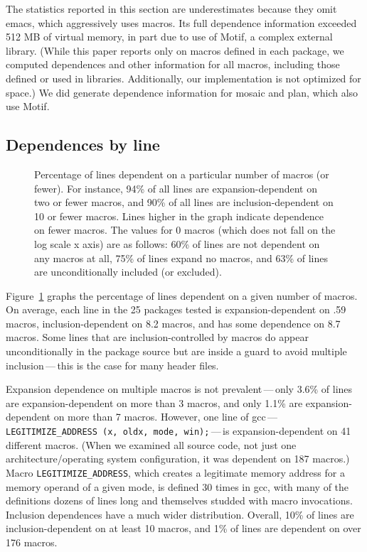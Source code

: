 \documentclass[10pt]{article}
\def\numdependpackages{25}
\newcommand{\pkg}[1]{\textsf{#1}}
\newcommand{\captionsmall}[1]{\caption[]{\small #1}}
\begin{document}
The statistics reported in this section are underestimates because they
omit \pkg{emacs}, which aggressively uses macros.  Its full dependence
information exceeded 512 MB of virtual memory, in part due to use of Motif,
a complex external library.  (While this paper reports only on macros
defined in each package, we computed dependences and other information for
all macros, including those defined or used in libraries.  Additionally,
our implementation is not optimized for space.)  We did generate dependence
information for \pkg{mosaic} and \pkg{plan}, which also use Motif.


\subsection{Dependences by line}

\begin{figure}
\centerline{}
\captionsmall{Percentage of lines dependent on a particular number of macros (or
  fewer).  For instance, 94\% of all lines are expansion-dependent on two
  or fewer macros, and 90\% of all lines are inclusion-dependent on 10 or
  fewer macros.  Lines higher in the graph indicate dependence on fewer
  macros.  The values for 0 macros (which does not fall on the log scale x
  axis) are as follows:  60\% of lines are not dependent on any macros at
  all, 75\% of lines expand no macros, and 63\% of lines are
  unconditionally included (or excluded).}
\label{fig:dep-byline}
\end{figure}



Figure~\ref{fig:dep-byline} graphs the percentage of lines dependent on a
given number of macros.  On average, each line in the {\numdependpackages}
packages tested is expansion-dependent on .59 macros, inclusion-dependent
on 8.2 macros, and has some dependence on 8.7 macros.  Some lines that are
inclusion-controlled by macros do appear unconditionally in the package
source but are inside a guard to avoid multiple inclusion\,---\,this is the
case for many header files.


Expansion dependence on multiple macros is not prevalent\,---\,only 3.6\% of
lines are expansion-dependent on more than 3 macros, and only 1.1\% are
expansion-dependent on more than 7 macros.  However, one line of
\pkg{gcc}\,---\,{\tt \verb|LEGITIMIZE_ADDRESS| (x, oldx, mode,
win);}\,---\,is expansion-dependent on 41 different macros.  (When we
examined all source code, not just one architecture/operating system configuration, it
was dependent on 187 macros.)  Macro \verb|LEGITIMIZE_ADDRESS|, which
creates a legitimate memory address for a memory operand of a given mode,
is defined 30 times in \pkg{gcc}, with many of the definitions dozens of
lines long and themselves studded with macro invocations.
Inclusion dependences have a much wider distribution.  Overall, 10\% of lines
are inclusion-dependent on at least 10 macros, and 1\% of lines are
dependent on over 176 macros.
\end{document}
